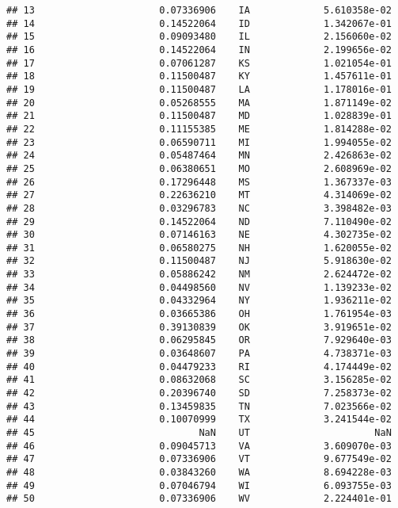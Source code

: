 \documentclass{article}\usepackage[]{graphicx}\usepackage[]{color}
\makeatletter
\newenvironment{kframe}{%
 \def\at@end@of@kframe{}%
 \ifinner\ifhmode%
  \def\at@end@of@kframe{\end{minipage}}%
  \begin{minipage}{\columnwidth}%
 \fi\fi%
 \def\FrameCommand##1{\hskip\@totalleftmargin \hskip-\fboxsep
 \colorbox{shadecolor}{##1}\hskip-\fboxsep
     \hskip-\linewidth \hskip-\@totalleftmargin \hskip\columnwidth}%
 \MakeFramed {\advance\hsize-\width
   \@totalleftmargin\z@ \linewidth\hsize
   \@setminipage}}%
 {\par\unskip\endMakeFramed%
 \at@end@of@kframe}
\newenvironment{knitrout}{}{} %
\makeatother
\begin{document}
\begin{knitrout}
\begin{kframe}
\begin{verbatim}
## 13                      0.07336906    IA             5.610358e-02
## 14                      0.14522064    ID             1.342067e-01
## 15                      0.09093480    IL             2.156060e-02
## 16                      0.14522064    IN             2.199656e-02
## 17                      0.07061287    KS             1.021054e-01
## 18                      0.11500487    KY             1.457611e-01
## 19                      0.11500487    LA             1.178016e-01
## 20                      0.05268555    MA             1.871149e-02
## 21                      0.11500487    MD             1.028839e-01
## 22                      0.11155385    ME             1.814288e-02
## 23                      0.06590711    MI             1.994055e-02
## 24                      0.05487464    MN             2.426863e-02
## 25                      0.06380651    MO             2.608969e-02
## 26                      0.17296448    MS             1.367337e-03
## 27                      0.22636210    MT             4.314069e-02
## 28                      0.03296783    NC             3.398482e-03
## 29                      0.14522064    ND             7.110490e-02
## 30                      0.07146163    NE             4.302735e-02
## 31                      0.06580275    NH             1.620055e-02
## 32                      0.11500487    NJ             5.918630e-02
## 33                      0.05886242    NM             2.624472e-02
## 34                      0.04498560    NV             1.139233e-02
## 35                      0.04332964    NY             1.936211e-02
## 36                      0.03665386    OH             1.761954e-03
## 37                      0.39130839    OK             3.919651e-02
## 38                      0.06295845    OR             7.929640e-03
## 39                      0.03648607    PA             4.738371e-03
## 40                      0.04479233    RI             4.174449e-02
## 41                      0.08632068    SC             3.156285e-02
## 42                      0.20396740    SD             7.258373e-02
## 43                      0.13459835    TN             7.023566e-02
## 44                      0.10070999    TX             3.241544e-02
## 45                             NaN    UT                      NaN
## 46                      0.09045713    VA             3.609070e-03
## 47                      0.07336906    VT             9.677549e-02
## 48                      0.03843260    WA             8.694228e-03
## 49                      0.07046794    WI             6.093755e-03
## 50                      0.07336906    WV             2.224401e-01

\end{verbatim}
\end{kframe}
\end{knitrout}
\end{document}
